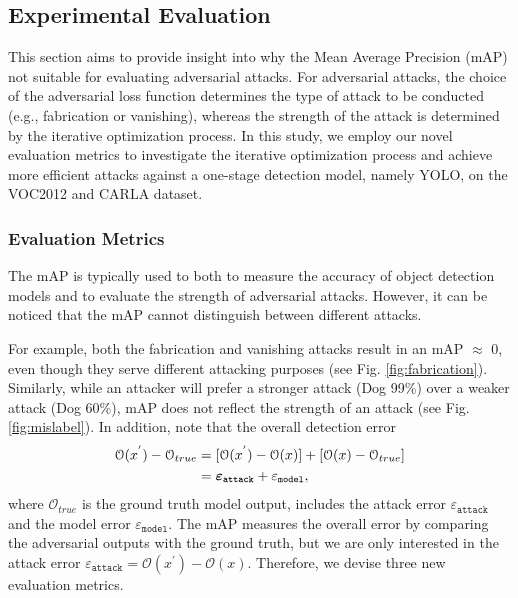 
\subsection{Experimental Evaluation}

This section aims to provide insight into why the Mean Average Precision (mAP) not suitable for evaluating adversarial attacks. For adversarial attacks, the choice of the adversarial loss function determines the type of attack to be conducted (e.g., fabrication or vanishing), whereas the strength of the attack is determined by the iterative optimization process. In this study, we employ our novel evaluation metrics to investigate the  iterative optimization process  and achieve more efficient attacks against a one-stage detection model, namely YOLO, on the VOC2012 \citep{pascal-voc-2012} and CARLA \citep{deschaud2021kitticarla} dataset.


\subsubsection{Evaluation Metrics}

The mAP \citep{cartucho2018} is typically used to both to measure the accuracy of object detection models and to evaluate the strength of adversarial attacks. However, it can be noticed that the mAP cannot distinguish between different attacks. 

For example, both the fabrication and vanishing attacks result in an mAP $\approx$ 0, even though they serve different attacking purposes (see Fig. \ref{fig:fabrication}). Similarly, while an attacker will prefer a stronger attack (Dog 99\%) over a weaker attack (Dog 60\%), mAP does not reflect the strength of an attack (see Fig. \ref{fig:mislabel}).
In addition, note that the overall detection error 
\begin{align}
\begin{split}
\mathcal{O}(x^{'}) - \mathcal{O}_{true} & = [\mathcal{O}(x^{'}) - \mathcal{O}(x)] + [\mathcal{O}(x) - \mathcal{O}_{true}] \\
& = \bm{\varepsilon}_{\textbf{\texttt{attack}}} + \varepsilon_{\texttt{model}},
\end{split}
\end{align}
where $\mathcal{O}_{true}$ is the ground truth model output, includes the attack error $\varepsilon_{\texttt{attack}}$ and the model error $\varepsilon_{\texttt{model}}$. The mAP measures the overall error by comparing the adversarial outputs with the ground truth, but we are only interested in the attack error $\varepsilon_{\texttt{attack}}=\mathcal{O}(x^{'}) - \mathcal{O}(x)$.
Therefore, we devise three new evaluation metrics.

